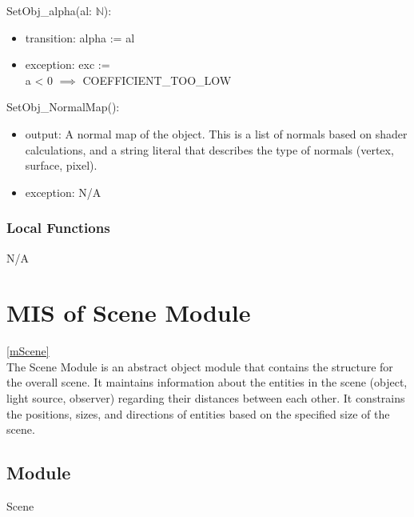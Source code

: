 \documentclass[12pt, titlepage]{article}
\begin{document}
\noindent SetObj\_alpha(al: $\mathbb{N}$):
\begin{itemize}
	\item transition: alpha := al
	\item exception: exc := {\\
		a < 0 $\implies$ COEFFICIENT\_TOO\_LOW\\}
\end{itemize}

\noindent SetObj\_NormalMap():
\begin{itemize}
	\item output: A normal map of the object. This is a list of normals based 
	on shader calculations, and a string literal that describes the type of 
	normals (vertex, surface, pixel).
	\item exception: N/A
\end{itemize}

\subsubsection{Local Functions}
N/A

\newpage

\section{MIS of Scene Module} \ref{mScene} \\
The Scene Module is an abstract object module that contains the structure for 
the overall scene. It maintains information about the entities in the scene 
(object, light source, observer) regarding their distances between each other. 
It constrains the positions, sizes, and directions of entities based on the 
specified size of the scene.
%
%

\subsection{Module}
Scene
\end{document}
